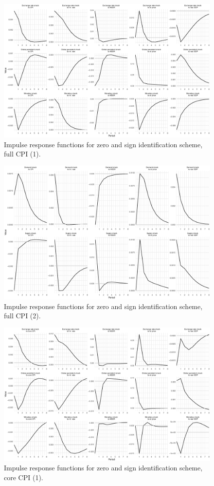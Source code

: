 \documentclass[12pt, a4paper]{extarticle}
\begin{document}
\begin{figure}
	\centering
	\includegraphics[width=0.9\linewidth]{figures/irf_1}
	\caption[]{Impulse response functions for zero and sign identification scheme, full CPI (1).}
	\label{fig:irf_1}
\end{figure}

\begin{figure}
	\centering
	\includegraphics[width=0.9\linewidth]{figures/irf_2}
	\caption[]{Impulse response functions for zero and sign identification scheme, full CPI (2).}
	\label{fig:irf_2}
\end{figure}

\begin{figure}
	\centering
	\includegraphics[width=0.9\linewidth]{figures/irf_core_1}
	\caption[]{Impulse response functions for zero and sign identification scheme, core CPI (1).}
	\label{fig:irf_core_1}
\end{figure}
\end{document}
